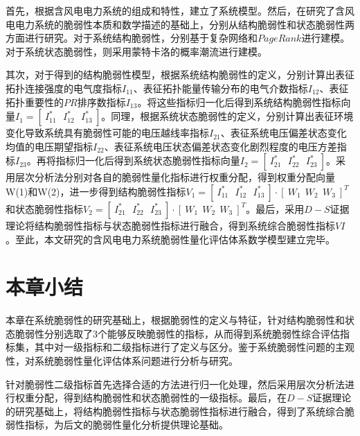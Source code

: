 首先，根据含风电电力系统的组成和特性，建立了系统模型。然后，在研究了含风电电力系统的脆弱性本质和数学描述的基础上，分别从结构脆弱性和状态脆弱性两方面进行研究。对于系统结构脆弱性，分别基于复杂网络和$PageRank$进行建模。对于系统状态脆弱性，则采用蒙特卡洛的概率潮流进行建模。

其次，对于得到的结构脆弱性模型，根据系统结构脆弱性的定义，分别计算出表征拓扑连接强度的电气度指标$I_{11}$、表征拓扑能量传输分布的电气介数指标$I_{12}$、表征拓扑重要性的$PR$排序数指标$I_{13}$。将这些指标归一化后得到系统结构脆弱性指标向量$I_{1}=\left[~I_{11}^{\ast}~~~I_{12}^{\ast}~~~I_{13}^{\ast}~\right]$。同理，根据系统状态脆弱性的定义，分别计算出表征环境变化导致系统具有脆弱性可能的电压越线率指标$I_{21}$、表征系统电压偏差状态变化均值的电压期望指标$I_{22}$、表征系统电压状态偏差状态变化剧烈程度的电压方差指标$I_{23}$。再将指标归一化后得到系统状态脆弱性指标向量$I_{2}=\left[~I_{21}^{\ast}~~~I_{22}^{\ast}~~~I_{23}^{\ast}~\right]$。采用层次分析法分别对各自的脆弱性量化指标进行权重分配，得到权重分配向量W(1)和W(2)，进一步得到结构脆弱性指标$V_1=\left[~I_{11}^{\ast}~~~I_{12}^{\ast}~~~I_{13}^{\ast}~\right]\cdot \left[~W_1~~W_2~~W_3~\right]^T$和状态脆弱性指标$V_2=\left[~I_{21}^{\ast}~~~I_{22}^{\ast}~~~I_{23}^{\ast}~\right]\cdot \left[~W_1~~W_2~~W_3~\right]^T$。最后，采用$D-S$证据理论将结构脆弱性指标与状态脆弱性指标进行融合，得到系统综合脆弱性指标$VI$。至此，本文研究的含风电电力系统脆弱性量化评估体系数学模型建立完毕。

\section{本章小结}
\label{sec:sum4}
本章在系统脆弱性的研究基础上，根据脆弱性的定义与特征，针对结构脆弱性和状态脆弱性分别选取了3个能够反映脆弱性的指标，从而得到系统脆弱性综合评估指标集，其中对一级指标和二级指标进行了定义与区分。鉴于系统脆弱性问题的主观性，对系统脆弱性量化评估体系问题进行分析与研究。

针对脆弱性二级指标首先选择合适的方法进行归一化处理，然后采用层次分析法进行权重分配，得到结构脆弱性和状态脆弱性的一级指标。最后，在$D-S$证据理论的研究基础上，将结构脆弱性指标与状态脆弱性指标进行融合，得到了系统综合脆弱性指标，为后文的脆弱性量化分析提供理论基础。



